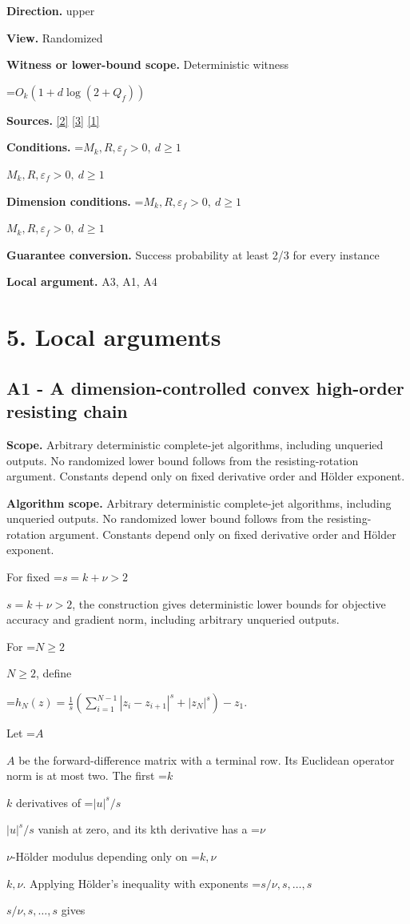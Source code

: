 \documentclass[10pt,a4paper]{article}
\newcommand{\AtlasMath}[1]{\par\begingroup\centering\setbox0=\hbox{$\displaystyle #1$}\ifdim\wd0>1.4\linewidth\typeout{ATLAS WIDE FORMULA: \the\wd0}\fi\ifdim\wd0>\linewidth\resizebox{\linewidth}{!}{\box0}\else\box0\fi\par\endgroup}
\newcommand{\AtlasInlineMath}[1]{\begingroup\setbox0=\hbox{$#1$}\ifdim\wd0>.4\linewidth\endgroup\AtlasMath{#1}\else\endgroup$#1$\fi}
\begin{document}
\textbf{Direction.} upper

\textbf{View.} Randomized

\textbf{Witness or lower-bound scope.} Deterministic witness

\AtlasMath{O_k(1+d\log(2+Q_f))}
\textbf{Sources.} \href{https://arxiv.org/pdf/2411.08987v2}{[2]} \href{https://msp.org/pjm/1960/10-4/pjm-v10-n4-p18-s.pdf}{[3]} \href{https://arxiv.org/pdf/2205.09647v1}{[1]}

\textbf{Conditions.} \AtlasInlineMath{M_k,R,\varepsilon_f>0,\ d\ge1}

\textbf{Dimension conditions.} \AtlasInlineMath{M_k,R,\varepsilon_f>0,\ d\ge1}

\textbf{Guarantee conversion.} Success probability at least 2/3 for every instance

\textbf{Local argument.} A3, A1, A4

\section{5. Local arguments}
\subsection{A1 - A dimension-controlled convex high-order resisting chain}
\textbf{Scope.} Arbitrary deterministic complete-jet algorithms, including unqueried outputs. No randomized lower bound follows from the resisting-rotation argument. Constants depend only on fixed derivative order and Hölder exponent.

\textbf{Algorithm scope.} Arbitrary deterministic complete-jet algorithms, including unqueried outputs. No randomized lower bound follows from the resisting-rotation argument. Constants depend only on fixed derivative order and Hölder exponent.

For fixed \AtlasInlineMath{s=k+\nu>2}, the construction gives deterministic lower bounds for objective accuracy and gradient norm, including arbitrary unqueried outputs.

For \AtlasInlineMath{N\ge2}, define



\AtlasMath{h_N(z)=\frac1s\left(\sum_{i=1}^{N-1}|z_i-z_{i+1}|^s+|z_N|^s\right)-z_1.}



Let \AtlasInlineMath{A} be the forward-difference matrix with a terminal row. Its Euclidean operator norm is at most two. The first \AtlasInlineMath{k} derivatives of \AtlasInlineMath{|u|^s/s} vanish at zero, and its kth derivative has a \AtlasInlineMath{\nu}-Hölder modulus depending only on \AtlasInlineMath{k,\nu}. Applying Hölder's inequality with exponents \AtlasInlineMath{s/\nu,s,\ldots,s} gives
\end{document}
